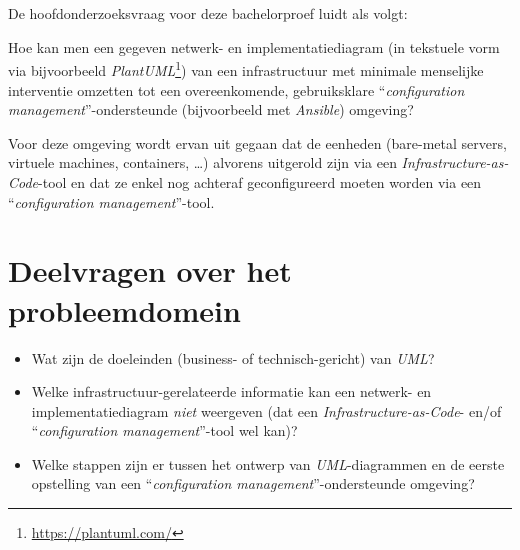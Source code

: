 \section{}%
\label{sec:inl_hoofdonderzoeksvraag}


De hoofdonderzoeksvraag voor deze bachelorproef luidt als volgt:

Hoe kan men een gegeven netwerk- en implementatiediagram (in tekstuele vorm via bijvoorbeeld \emph{PlantUML}\footnote{\url{https://plantuml.com/}}) van een infrastructuur met minimale menselijke interventie omzetten tot een overeenkomende, gebruiksklare ``\emph{configuration management}''-ondersteunde (bijvoorbeeld met \emph{Ansible}) omgeving?

Voor deze omgeving wordt ervan uit gegaan dat de eenheden (bare-metal servers, virtuele machines, containers, \ldots) alvorens uitgerold zijn via een \emph{Infrastructure-as-Code}-tool en dat ze enkel nog achteraf geconfigureerd moeten worden via een ``\emph{configuration management}''-tool.


\section{Deelvragen over het probleemdomein}%
\label{sec:inl_deelvragen_probleemdomein}

\begin{itemize}
  \item Wat zijn de doeleinden (business- of technisch-gericht) van \emph{UML}?
  \item Welke infrastructuur-gerelateerde informatie kan een netwerk- en implementatiediagram \emph{niet} weergeven (dat een \emph{Infrastructure-as-Code}- en/of ``\emph{configuration management}''-tool wel kan)?
  \item Welke stappen zijn er tussen het ontwerp van \emph{UML}-diagrammen en de eerste opstelling van een ``\emph{configuration management}''-ondersteunde omgeving?
\end{itemize}

